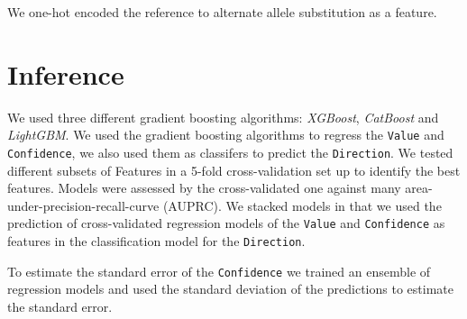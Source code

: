 \documentclass{article}
\begin{document}
We one-hot encoded the reference to alternate allele substitution as a feature.


\section*{Inference}

We used three different gradient boosting algorithms: \emph{XGBoost},
\emph{CatBoost} and \emph{LightGBM}. We used the gradient boosting algorithms
to regress the \texttt{Value} and \texttt{Confidence}, we also used them as
classifers to predict the \texttt{Direction}. We tested different subsets of
Features in a 5-fold cross-validation set up to identify the best features.
Models were assessed by the cross-validated one against many
area-under-precision-recall-curve (AUPRC). We stacked models in that we used
the prediction of cross-validated regression models of the \texttt{Value} and
\texttt{Confidence} as features in the classification model for the
\texttt{Direction}.

To estimate the standard error of the \texttt{Confidence} we trained an
ensemble of regression models and used the standard deviation of the
predictions to estimate the standard error.
\end{document}
